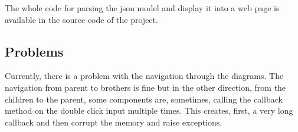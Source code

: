 The whole code for parsing the json model and display it into a web page is
available in the source code of the project.

\subsection{Problems}
\label{sec:problems}

Currently, there is a problem with the navigation through the diagrams. The
navigation from parent to brothers is fine but in the other direction, from the
children to the parent, some components are, sometimes, calling the callback
method on the double click input multiple times. This creates, first, a very long
callback and then corrupt the memory and raise exceptions.

